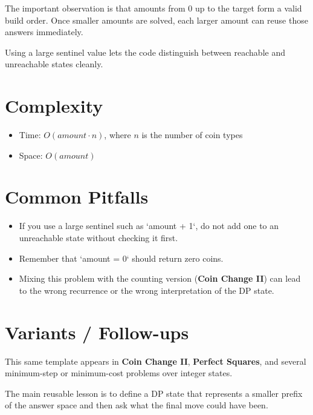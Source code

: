 The important observation is that amounts from \(0\) up to the target form a valid build order. Once smaller amounts are solved, each larger amount can reuse those answers immediately.

Using a large sentinel value lets the code distinguish between reachable and unreachable states cleanly.

\section{Complexity}
\begin{itemize}
\item Time: \(O(amount \cdot n)\), where \(n\) is the number of coin types
\item Space: \(O(amount)\)
\end{itemize}

\section{Common Pitfalls}
\begin{itemize}
\item If you use a large sentinel such as `amount + 1`, do not add one to an unreachable state without checking it first.
\item Remember that `amount = 0` should return zero coins.
\item Mixing this problem with the counting version (\textbf{Coin Change II}) can lead to the wrong recurrence or the wrong interpretation of the DP state.
\end{itemize}

\section{Variants / Follow-ups}
This same template appears in \textbf{Coin Change II}, \textbf{Perfect Squares}, and several minimum-step or minimum-cost problems over integer states.

The main reusable lesson is to define a DP state that represents a smaller prefix of the answer space and then ask what the final move could have been.
